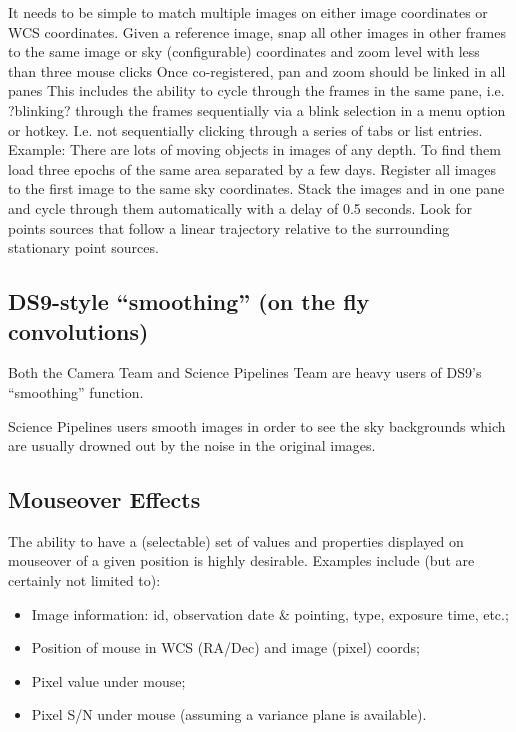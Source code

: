 \begin{itemize}
{\item{It needs to be simple to match multiple images on either image coordinates or WCS coordinates.}
Given a reference image, snap all other images in other frames to the same image or sky (configurable) coordinates and zoom level with less than three mouse clicks
Once co-registered, pan and zoom should be linked in all panes
This includes the ability to cycle through the frames in the same pane, i.e. ?blinking? through the frames sequentially via a blink selection in a menu option or hotkey.  I.e. not sequentially clicking through a series of tabs or list entries.
Example: There are lots of moving objects in images of any depth.  To find them load three epochs of the same area separated by a few days.  Register all images to the first image to the same sky coordinates.  Stack the images and in one pane and cycle through them automatically with a delay of 0.5 seconds.  Look for points sources that follow a linear trajectory relative to the surrounding stationary point sources.}
\end{itemize}

\subsection{DS9-style ``smoothing'' (on the fly convolutions)}
Both the Camera Team and Science Pipelines Team are heavy users of DS9's ``smoothing'' function.

Science Pipelines users smooth images in order to see the sky backgrounds which are usually drowned out by the noise in the original images. 


\subsection{Mouseover Effects}
The ability to have a (selectable) set of values and properties displayed on mouseover of a given position is highly desirable.  Examples include (but are certainly not limited to):
\begin{itemize}
\item{Image information: id, observation date \& pointing, type, exposure time, etc.;}
\item{Position of mouse in WCS (RA/Dec) and image (pixel) coords;}
\item{Pixel value under mouse;}
\item{Pixel S/N under mouse (assuming a variance plane is available).}
\end{itemize}

